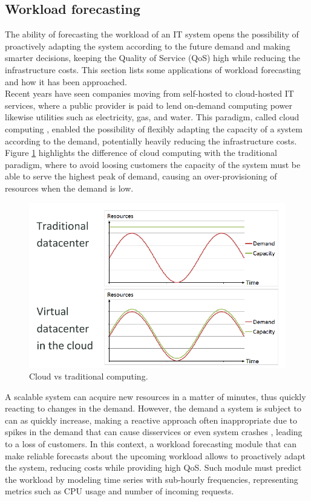 \documentclass[a4paper, 12pt]{article} %
\begin{document}
	\subsection{ Workload forecasting } \label{ssec:workload_forecasting}
	The ability of forecasting the workload of an IT system opens the possibility of proactively adapting the system according to the future demand and making smarter decisions, keeping the Quality of Service (QoS) high while reducing the infrastructure costs. This section lists some applications of workload forecasting and how it has been approached.\\
	Recent years have seen companies moving from self-hosted to cloud-hosted  IT services, where a public provider is paid to lend on-demand computing power likewise utilities such as electricity, gas, and water. This paradigm, called cloud computing \cite{CloudComputing}, enabled the possibility of flexibly adapting the capacity of a system according to the demand, potentially heavily reducing the infrastructure costs.  Figure \ref{fig:cloud_vs_traditional_computing} highlights the difference of cloud computing with the traditional paradigm, where to avoid loosing customers the capacity of the system must be able to serve the highest peak of demand, causing an over-provisioning of resources when the demand is low.\\
	\begin{figure}
		\includegraphics[width=\linewidth]{img/cloud_vs_traditional_computing.png}
		\caption{Cloud vs traditional computing.}
		\label{fig:cloud_vs_traditional_computing}
	\end{figure}
	A scalable system can acquire new resources in a matter of minutes, thus quickly reacting to changes in the demand. However, the demand a system is subject to can as quickly increase, making a reactive approach often inappropriate due to spikes in the demand that can cause disservices or even system crashes \cite{ArimaWorkloadPrediction}, leading to a loss of customers. In this context, a workload forecasting module that can make reliable forecasts about the upcoming workload allows to proactively adapt the system, reducing costs while providing high QoS. Such module must predict the workload by modeling time series with sub-hourly frequencies, representing metrics such as CPU usage and number of incoming requests.\\
\end{document}
